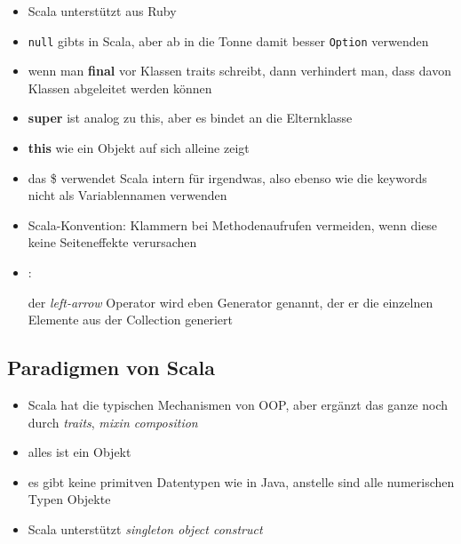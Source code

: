 \begin{itemize}
{  ist}, \textit{singleton types}\footnote{für Typen gibt es genau einen
  Wert}, \textit{explicit self types}\footnote{sind Annotationen, die den Typ 
  einer aktuellen Instanz einer Klasse festlegen}
  \item Scala unterstützt  aus Ruby
  \item \texttt{null} gibts in Scala, aber ab in die Tonne damit \und 
  besser \texttt{Option} verwenden
  \item wenn man \textbf{final} vor Klassen \oder traits schreibt, dann
  verhindert man, dass davon Klassen abgeleitet werden können
  \item \textbf{super} ist analog zu this, aber es bindet an die Elternklasse
  \item \textbf{this} wie ein Objekt auf sich alleine zeigt
  \item das \$ verwendet Scala intern für irgendwas, also ebenso wie
  die keywords nicht als Variablennamen verwenden
  \item Scala-Konvention: Klammern bei Methodenaufrufen vermeiden, wenn
  diese keine Seiteneffekte verursachen
  \item {}:
  
  
  
  der \textit{left-arrow} Operator wird eben Generator genannt, der er die
  einzelnen Elemente aus der Collection generiert
\end{itemize}


\subsection{Paradigmen von Scala}
\label{abs:Paradigmen von Scala}


\begin{itemize}
  \item Scala hat die typischen Mechanismen von OOP, aber ergänzt das ganze
  noch durch \textit{traits}, \textit{mixin composition}
  \item alles ist ein Objekt
  \item es gibt keine primitven Datentypen wie in Java, anstelle sind alle 
  numerischen Typen Objekte
  \item Scala unterstützt \textit{singleton object construct}
\end{itemize}




